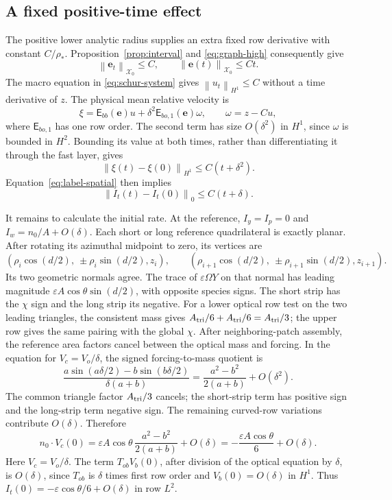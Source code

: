 \documentclass[11pt,a4paper]{article}
\numberwithin{equation}{section}
\theoremstyle{remark}
\newcommand{\norm}[1]{\left\lVert #1\right\rVert}
\newcommand{\Graph}{\mathsf E}
\newcommand{\Xzero}{\mathcal X_0}
\begin{document}
\subsection{A fixed positive-time effect}

The positive lower analytic radius supplies an extra fixed row
derivative with constant \(C/\rho_*\). Proposition~\ref{prop:interval}
and \eqref{eq:graph-high} consequently give
\[
                  \norm{\mathbf e_t}_{\Xzero}\leq C,\qquad
                  \norm{\mathbf e(t)}_{\Xzero}\leq Ct .
\]
The macro equation in \eqref{eq:schur-system} gives
\(\norm{u_t}_{H^1}\leq C\) without a time derivative of \(z\).
The physical mean relative velocity is
\[
 \xi=\Graph_{bb}(\mathbf e)u
                         +\delta^2\Graph_{bo,1}(\mathbf e)\omega ,
 \qquad \omega=z-Cu ,
\]
where \(\Graph_{bo,1}\) has one row order. The second term has
size \(O(\delta^2)\) in \(H^1\), since \(\omega\) is bounded
in \(H^2\). Bounding its value at both times, rather than
differentiating it through the fast layer, gives
\[
 \norm{\xi(t)-\xi(0)}_{H^1}\leq C(t+\delta^2).
\]
Equation~\eqref{eq:label-spatial} then implies
\begin{equation}\label{eq:label-modulus}
                       \norm{I_t(t)-I_t(0)}_0\leq C(t+\delta).
\end{equation}

It remains to calculate the initial rate. At the reference,
\(I_y=I_p=0\) and \(I_w=n_0/A+O(\delta)\).
Each short or long reference quadrilateral is exactly planar.
After rotating its azimuthal midpoint to zero, its vertices are
\[
 (\rho_i\cos(d/2),\ \pm\rho_i\sin(d/2),z_i),\qquad
 (\rho_{i+1}\cos(d/2),\ \pm\rho_{i+1}\sin(d/2),z_{i+1}) .
\]
Its two geometric normals agree. The trace of
\(\varepsilon\Omega Y\) on that normal has leading magnitude
\(\varepsilon A\cos\theta\sin(d/2)\), with opposite species signs.
The short strip has the \(\chi\) sign and the long strip its negative.
For a lower optical row test on the two leading triangles, the
consistent mass gives \(A_{\rm tri}/6+A_{\rm tri}/6=A_{\rm tri}/3\);
the upper row gives the same pairing with the global \(\chi\).
After neighboring-patch assembly, the reference area factors cancel
between the optical mass and forcing. In the equation for
\(V_c=V_o/\delta\), the signed forcing-to-mass quotient is
\[
 \frac{a\sin(a\delta/2)-b\sin(b\delta/2)}{\delta(a+b)}
       =\frac{a^2-b^2}{2(a+b)}+O(\delta^2).
\]
The common triangle factor \(A_{\rm tri}/3\) cancels; the short-strip
term has positive sign and the long-strip term negative sign.
The remaining curved-row variations contribute \(O(\delta)\).
Therefore
\begin{equation}\label{eq:initial-minus-sixth}
 n_0\cdot V_c(0)
   =\varepsilon A\cos\theta\,\frac{a^2-b^2}{2(a+b)}+O(\delta)
   =-\frac{\varepsilon A\cos\theta}{6}+O(\delta).
\end{equation}
Here \(V_c=V_o/\delta\).
The term \(T_{ob}V_b(0)\), after division of the optical equation
by \(\delta\), is \(O(\delta)\), since \(T_{ob}\) is \(\delta\)
times first row order and \(V_b(0)=O(\delta)\) in \(H^1\).
Thus \(I_t(0)=-\varepsilon\cos\theta/6+O(\delta)\) in row \(L^2\).
\end{document}
